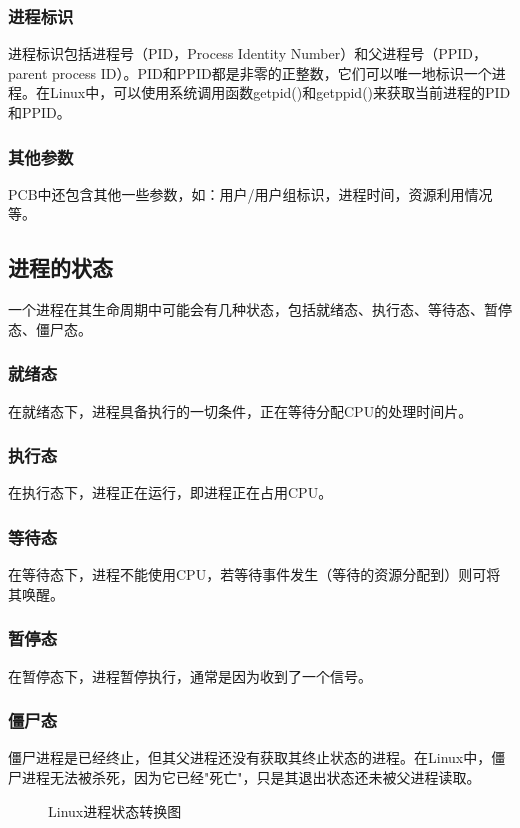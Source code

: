 \documentclass[12pt, a4paper, oneside]{ctexbook}
\numberwithin{figure}{section}
\begin{document}
\subsubsection{进程标识}
进程标识包括进程号（PID，Process Identity Number）和父进程号（PPID，parent process ID）。PID和PPID都是非零的正整数，它们可以唯一地标识一个进程。在Linux中，可以使用系统调用函数getpid()和getppid()来获取当前进程的PID和PPID。

\subsubsection{其他参数}
PCB中还包含其他一些参数，如：用户/用户组标识，进程时间，资源利用情况等。

\subsection{进程的状态}
一个进程在其生命周期中可能会有几种状态，包括就绪态、执行态、等待态、暂停态、僵尸态。

\subsubsection{就绪态}
在就绪态下，进程具备执行的一切条件，正在等待分配CPU的处理时间片。

\subsubsection{执行态}
在执行态下，进程正在运行，即进程正在占用CPU。

\subsubsection{等待态}
在等待态下，进程不能使用CPU，若等待事件发生（等待的资源分配到）则可将其唤醒。

\subsubsection{暂停态}
在暂停态下，进程暂停执行，通常是因为收到了一个信号。

\subsubsection{僵尸态}
僵尸进程是已经终止，但其父进程还没有获取其终止状态的进程。在Linux中，僵尸进程无法被杀死，因为它已经"死亡"，只是其退出状态还未被父进程读取。

\begin{figure}[H]
\centering
 \caption{Linux进程状态转换图}
 \label{}
\end{figure}
\end{document}
